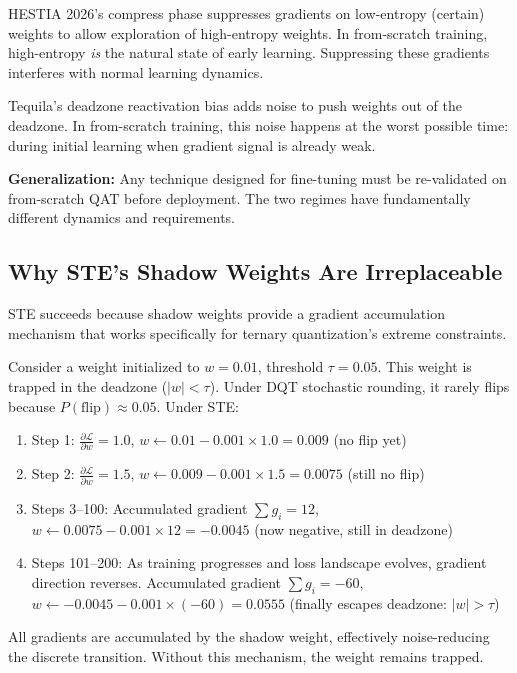 \documentclass{article}
\begin{document}
HESTIA 2026's compress phase suppresses gradients on low-entropy (certain) weights to allow exploration of high-entropy weights. In from-scratch training, high-entropy \emph{is} the natural state of early learning. Suppressing these gradients interferes with normal learning dynamics.

Tequila's deadzone reactivation bias adds noise to push weights out of the deadzone. In from-scratch training, this noise happens at the worst possible time: during initial learning when gradient signal is already weak.

\textbf{Generalization:} Any technique designed for fine-tuning must be re-validated on from-scratch QAT before deployment. The two regimes have fundamentally different dynamics and requirements.

\subsection{Why STE's Shadow Weights Are Irreplaceable}

STE succeeds because shadow weights provide a gradient accumulation mechanism that works specifically for ternary quantization's extreme constraints.

Consider a weight initialized to $w = 0.01$, threshold $\tau = 0.05$. This weight is trapped in the deadzone ($|w| < \tau$). Under DQT stochastic rounding, it rarely flips because $P(\text{flip}) \approx 0.05$. Under STE:
\begin{enumerate}
    \item Step 1: $\frac{\partial \mathcal{L}}{\partial w} = 1.0$, $w \leftarrow 0.01 - 0.001 \times 1.0 = 0.009$ (no flip yet)
    \item Step 2: $\frac{\partial \mathcal{L}}{\partial w} = 1.5$, $w \leftarrow 0.009 - 0.001 \times 1.5 = 0.0075$ (still no flip)
    \item Steps 3--100: Accumulated gradient $\sum g_i = 12$, $w \leftarrow 0.0075 - 0.001 \times 12 = -0.0045$ (now negative, still in deadzone)
    \item Steps 101--200: As training progresses and loss landscape evolves, gradient direction reverses. Accumulated gradient $\sum g_i = -60$, $w \leftarrow -0.0045 - 0.001 \times (-60) = 0.0555$ (finally escapes deadzone: $|w| > \tau$)
\end{enumerate}

All gradients are accumulated by the shadow weight, effectively noise-reducing the discrete transition. Without this mechanism, the weight remains trapped.
\end{document}
